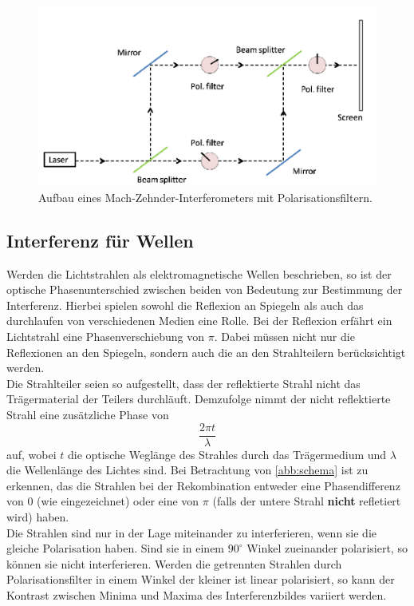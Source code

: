 \documentclass[numbers=noenddot,a4paper,notitlepage,twoside,BCOR15mm]{scrartcl}
\begin{document}
		\begin{figure}[h]
			\centering
			\includegraphics[width=1\textwidth]{pics/schema.png}
			\caption{Aufbau eines Mach-Zehnder-Interferometers mit Polarisationsfiltern. \cite{EMAUGreifswaldMAZ}}
			\label{abb:schema}
		\end{figure}
	
	\subsection{Interferenz für Wellen}
	
	Werden die Lichtstrahlen als elektromagnetische Wellen beschrieben, so ist der optische Phasenunterschied zwischen beiden von Bedeutung zur Bestimmung der Interferenz. Hierbei spielen sowohl die Reflexion an Spiegeln als auch das durchlaufen von verschiedenen Medien eine Rolle. Bei der Reflexion erfährt ein Lichtstrahl eine Phasenverschiebung von $\pi$. Dabei müssen nicht nur die Reflexionen an den Spiegeln, sondern auch die an den Strahlteilern berücksichtigt werden.\\Die Strahlteiler seien so aufgestellt, dass der reflektierte Strahl nicht das Trägermaterial der Teilers durchläuft. Demzufolge nimmt der nicht reflektierte Strahl eine zusätzliche Phase von 
	\begin{equation}
		\frac{2\pi t}{\lambda} \nonumber
	\end{equation}
	auf, wobei $t$ die optische Weglänge des Strahles durch das Trägermedium und $\lambda$ die Wellenlänge des Lichtes sind. Bei Betrachtung von \autoref{abb:schema} ist zu erkennen, das die Strahlen bei der Rekombination entweder eine Phasendifferenz von $0$ (wie eingezeichnet) oder eine von $\pi$ (falls der untere Strahl \textbf{nicht} refletiert wird) haben.\\
	Die Strahlen sind nur in der Lage miteinander zu interferieren, wenn sie die gleiche Polarisation haben. Sind sie in einem $90^\circ$ Winkel zueinander polarisiert, so können sie nicht interferieren. Werden die  getrennten Strahlen durch Polarisationsfilter in einem Winkel der kleiner ist linear polarisiert, so kann der Kontrast zwischen Minima und Maxima des Interferenzbildes variiert werden.
	
\end{document}
